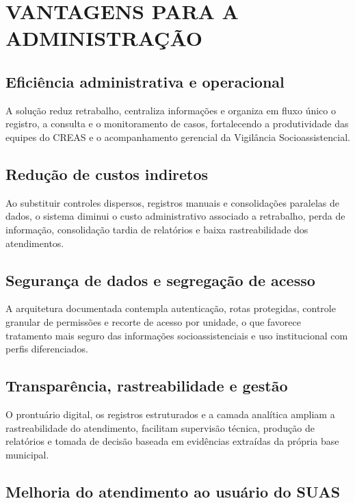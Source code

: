 \documentclass[12pt,a4paper]{article}
\begin{document}
\section{VANTAGENS PARA A ADMINISTRAÇÃO}

\subsection*{Eficiência administrativa e operacional}

A solução reduz retrabalho, centraliza informações e organiza em fluxo único o registro, a consulta e o monitoramento de casos, fortalecendo a produtividade das equipes do CREAS e o acompanhamento gerencial da Vigilância Socioassistencial.

\subsection*{Redução de custos indiretos}

Ao substituir controles dispersos, registros manuais e consolidações paralelas de dados, o sistema diminui o custo administrativo associado a retrabalho, perda de informação, consolidação tardia de relatórios e baixa rastreabilidade dos atendimentos.

\subsection*{Segurança de dados e segregação de acesso}

A arquitetura documentada contempla autenticação, rotas protegidas, controle granular de permissões e recorte de acesso por unidade, o que favorece tratamento mais seguro das informações socioassistenciais e uso institucional com perfis diferenciados.

\subsection*{Transparência, rastreabilidade e gestão}

O prontuário digital, os registros estruturados e a camada analítica ampliam a rastreabilidade do atendimento, facilitam supervisão técnica, produção de relatórios e tomada de decisão baseada em evidências extraídas da própria base municipal.

\subsection*{Melhoria do atendimento ao usuário do SUAS}
\end{document}
